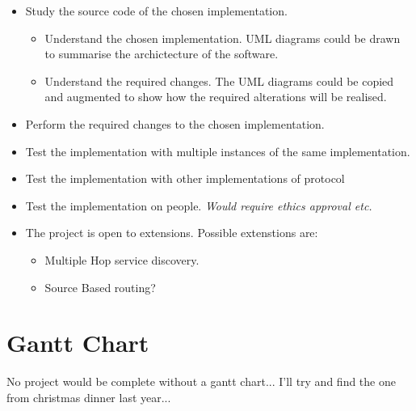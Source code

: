 \documentclass[12pt]{report}
\begin{document}
\begin{itemize}

\item Study the source code of the chosen implementation.

\begin{itemize}

\item Understand the chosen implementation.
UML diagrams could be drawn to summarise the archictecture of the software. 

\item Understand the required changes.
The UML diagrams could be copied and augmented to show how the required
alterations will be realised. 

\end{itemize}

\item Perform the required changes to the chosen implementation.
\item Test the implementation with multiple instances of the same implementation.
\item Test the implementation with other implementations of protocol 
\item Test the implementation on people. \em Would require ethics approval etc. \em

\item The project is open to extensions. Possible extenstions are:

\begin{itemize}
\item Multiple Hop service discovery.
\item Source Based routing?
\end{itemize}

\end{itemize}

\section{Gantt Chart}
No project would be complete without a gantt chart... I'll try and find the one from christmas dinner last year...
\end{document}
